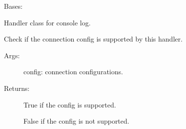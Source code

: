 \documentclass[letterpaper,10pt,english]{sphinxmanual}
\begin{document}
\begin{fulllineitems}

\begin{fulllineitems}
\label{\detokenize{QConnectionLibrary:QConnectionLibrary.qlogger.ColorFormatter.yellow}}\pysigline{\sphinxbfcode{\sphinxupquote{yellow}}\sphinxbfcode{\sphinxupquote{ = \textquotesingle{}\textbackslash{}x1b{[}33;21m\textquotesingle{}}}}
\end{fulllineitems}


\end{fulllineitems}


\begin{fulllineitems}
\label{\detokenize{QConnectionLibrary:QConnectionLibrary.qlogger.QConsoleHandler}}
\sphinxAtStartPar
Bases: 

\sphinxAtStartPar
Handler class for console log.

\begin{fulllineitems}
\label{\detokenize{QConnectionLibrary:QConnectionLibrary.qlogger.QConsoleHandler.get_config_supported}}
\sphinxAtStartPar
Check if the connection config is supported by this handler.
\begin{description}
\item[{Args:}] \leavevmode
\sphinxAtStartPar
config: connection configurations.

\item[{Returns:}] \leavevmode
\sphinxAtStartPar
True if the config is supported.

\sphinxAtStartPar
False if the config is not supported.

\end{description}

\end{fulllineitems}


\end{fulllineitems}
\end{document}
